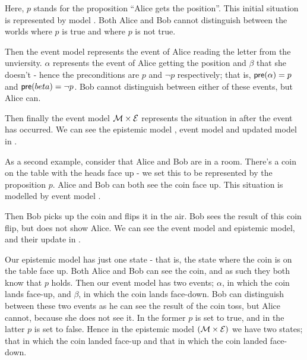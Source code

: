 \documentclass[12pt, a4paper]{article}
\begin{document}
Here, $p$ stands for the proposition ``Alice gets the position''. This initial
situation is represented by model . Both Alice and Bob cannot distinguish
between the worlds where $p$ is true and where $p$ is not true. 

Then the event model  represents the event of Alice reading the letter
from the unviersity. $\alpha$ represents the event of Alice getting the position
and $\beta$ that she doesn't - hence the preconditions are $p$ and $\neg
p$ respectively; that is, $\textsf{pre}(\alpha) = p$ and $\textsf{pre}(beta) = \neg p$. Bob
cannot distinguish between either of these events, but Alice can.

Then finally the event model $\mathcal{M} \times \mathcal{E}$ represents the situation
in  after the event  has occurred. We can see the epistemic model ,
event model  and updated model  in .

\bigskip

As a second example, consider that Alice and Bob are in a room. There's a coin
on the table with the heads face up - we set this to be represented by the
proposition $p$. Alice and Bob can both see the coin face up. This situation is
modelled by event model .

Then Bob picks up the coin and flips it in the air. Bob sees the result of this
coin flip, but does not show Alice. We can see the event model and epistemic
model, and their update in .

Our epistemic model has just one state - that is, the state where the coin is on
the table face up. Both Alice and Bob can see the coin, and as such they both
know that $p$ holds. Then our event model has two events; $\alpha$, in which the
coin lands face-up, and $\beta$, in which the coin lands face-down. Bob can
distinguish between these two events as he can see the result of the coin toss,
but Alice cannot, because she does not see it. In the former $p$ is set to true,
and in the latter $p$ is set to false. Hence in the epistemic model $(\mathcal{M}
\times \mathcal{E})$ we have two states; that in which the coin landed face-up and
that in which the coin landed face-down.
\end{document}
